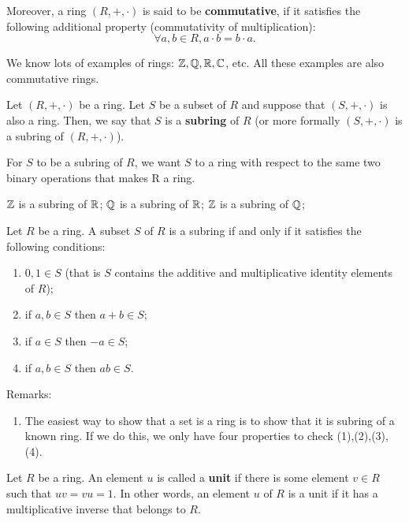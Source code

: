 \documentclass[12pt]{book}
\begin{document}
Moreover, a ring $(R,+, \cdot)$ is said to be \textbf{commutative}, if it satisfies the following additional property (commutativity of multiplication):
$$ \forall a, b \in R, a \cdot b = b \cdot a.$$

\begin{examp}\label{exp:ring1}
      We know lots of examples of rings: $\mathbb{Z}, \mathbb{Q}, \mathbb{R}, \mathbb{C}$,  etc.
      All these examples are also commutative rings.
\end{examp}

\begin{defi}\label{def:ring2}
      Let $(R,+, \cdot)$ be a ring. Let $S$ be a subset of $R$ and suppose that $(S,+, \cdot)$ is also a ring. Then, we say that $S$ is a \textbf{subring} of $R$ 
	  (or more formally $(S,+, \cdot)$ is a subring of $(R,+, \cdot)$).
\end{defi}
For $S$ to be a subring of $R$, we want $S$ to a ring with respect to the same two binary operations that makes R a ring.

\begin{examp}\label{exp:ring2}
            $\mathbb{Z}$ is a subring of $\mathbb{R}$; $\mathbb{Q}$ is a subring of $\mathbb{R}$; $\mathbb{Z}$ is a subring of $\mathbb{Q}$;
\end{examp}

\begin{defi}\label{def:ring3}
      Let $R$ be a ring. A subset $S$ of $R$ is a subring if and only if it satisfies the following conditions:
      \begin{enumerate}
	         \item $0, 1 \in S$ (that is $S$ contains the additive and multiplicative identity elements of $R$);
			 \item if $a, b \in S$ then $a + b \in S$;
			 \item if $a \in S$ then $-a \in S$;
			 \item if $a, b \in S$ then $ab \in S$. 
	  \end{enumerate}
\end{defi}

Remarks:
\begin{enumerate}
      \item The easiest way to show that a set is a ring is to show that it is subring of a known ring. If we do this, 
      we only have four properties to check (1),(2),(3),(4).
\end{enumerate}
\begin{defi}\label{def:rrr}
      Let $R$ be a ring. An element $u$ is called a \textbf{unit} if there is some element $v \in R$ such that $uv = vu = 1$. In other words, 
	  an element $u$ of $R$ is a unit if it has a multiplicative inverse that belongs to $R$.
\end{defi}
\end{document}
